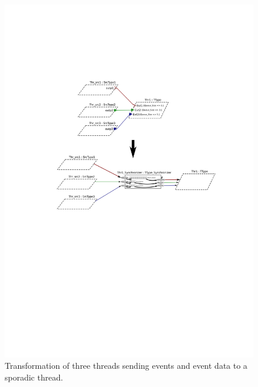 \begin{figure}
\centering
\includegraphics{figs/sync_transform}
\caption{Transformation of three threads sending events and event data
  to a sporadic thread.}
\label{fig:sync_transform}
\end{figure}

